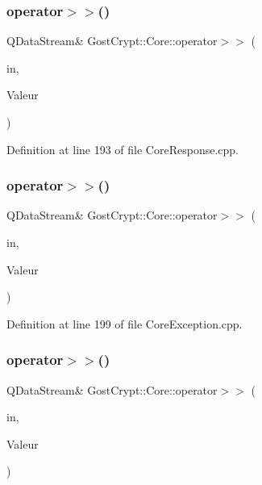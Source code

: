 \subsubsection{\texorpdfstring{operator$>$$>$()}{operator>>()}\hspace{0.1cm}{\footnotesize\ttfamily [33/56]}}
{\footnotesize\ttfamily Q\+Data\+Stream\& Gost\+Crypt\+::\+Core\+::operator$>$$>$ (\begin{DoxyParamCaption}\item[{Q\+Data\+Stream \&}]{in,  }\item[{\hyperlink{struct_gost_crypt_1_1_core_1_1_host_device}{Host\+Device} \&}]{Valeur }\end{DoxyParamCaption})}



Definition at line 193 of file Core\+Response.\+cpp.

\mbox{\label{namespace_gost_crypt_1_1_core_ac7e607328dbff6ca8309771c99d4df4d}} 
\subsubsection{\texorpdfstring{operator$>$$>$()}{operator>>()}\hspace{0.1cm}{\footnotesize\ttfamily [34/56]}}
{\footnotesize\ttfamily Q\+Data\+Stream\& Gost\+Crypt\+::\+Core\+::operator$>$$>$ (\begin{DoxyParamCaption}\item[{Q\+Data\+Stream \&}]{in,  }\item[{\hyperlink{class_gost_crypt_1_1_core_1_1_formatting_sub_exception}{Gost\+Crypt\+::\+Core\+::\+Formatting\+Sub\+Exception} \&}]{Valeur }\end{DoxyParamCaption})}



Definition at line 199 of file Core\+Exception.\+cpp.

\mbox{\label{namespace_gost_crypt_1_1_core_ab1ef65c46ef7494fa5fa1b80f5b9ea9c}} 
\subsubsection{\texorpdfstring{operator$>$$>$()}{operator>>()}\hspace{0.1cm}{\footnotesize\ttfamily [35/56]}}
{\footnotesize\ttfamily Q\+Data\+Stream\& Gost\+Crypt\+::\+Core\+::operator$>$$>$ (\begin{DoxyParamCaption}\item[{Q\+Data\+Stream \&}]{in,  }\item[{\hyperlink{struct_gost_crypt_1_1_core_1_1_exit_request}{Exit\+Request} \&}]{Valeur }\end{DoxyParamCaption})}



